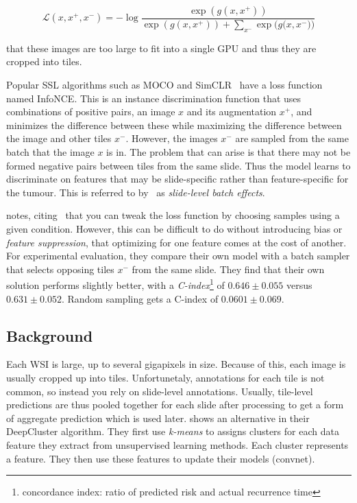 \documentclass[10pt,twocolumn,letterpaper]{article}
\begin{document}

$$ \mathcal{L}(x, x^{+}, x^{-}) = -\log{\frac{\exp(g(x,x^{+}))}{\exp(g(x,x^{+})) + \sum\limits_{x^{-}}{\exp(g(x,x^{-}}))}}$$

that these images are too large to fit into a single \gls{GPU} and thus they are cropped into tiles.  

Popular \gls{SSL} algorithms such as \gls{MOCO} and SimCLR~\cite{simCLR} have a loss function named \gls{InfoNCE}. This is an instance discrimination function that uses combinations of positive pairs, an image $x$ and its augmentation $x^{+}$, and minimizes the difference between these while maximizing the difference between the image and other tiles $x^{-}$. However, the images $x^{-}$ are sampled from the same batch that the image $x$ is in. The problem that can arise is that there may not be formed negative pairs between tiles from the same slide. Thus the model learns to discriminate on features that may be slide-specific rather than feature-specific for the tumour. This is referred to by~\cite{sslUMAP} as \textit{slide-level batch effects}.

\cite{sslUMAP} notes, citing~\cite{contrastiveShortcut} that you can tweak the loss function by choosing samples using a given condition. However, this can be difficult to do without introducing bias or \textit{feature suppression}, that optimizing for one feature comes at the cost of another. For experimental evaluation, they compare their own model with a batch sampler that selects opposing tiles $x^{-}$ from the same slide. They find that their own solution performs slightly better, with a \textit{C-index}\footnote{concordance index: ratio of predicted risk and actual recurrence time} of $0.646 \pm 0.055$ versus $0.631 \pm 0.052$. Random sampling gets a C-index of $0.0601 \pm 0.069$.

\subsection{Background}
Each \gls{WSI} is large, up to several gigapixels in size. Because of this, each image is usually cropped up into tiles. Unfortunetaly, annotations for each tile is not common, so instead you rely on slide-level annotations. Usually, tile-level predictions are thus pooled together for each slide after processing to get a form of aggregate prediction which is used later. \cite{unsupervisedClustering} shows an alternative in their DeepCluster algorithm. They first use \textit{k-means} to assigns clusters for each data feature they extract from unsupervised learning methods. Each cluster represents a feature. They then use these features to update their models (convnet). 
\end{document}
